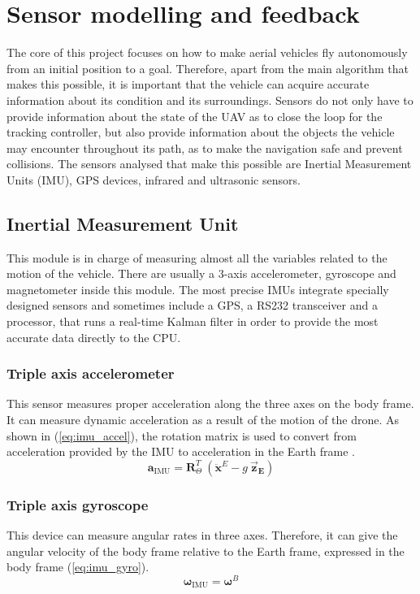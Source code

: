 \documentclass[journal, twoside]{IEEEtran}
\newcommand*{\subb}[1]{_{\mathrm{#1}}}
\begin{document}
	\section{Sensor modelling and feedback}
	The core of this project focuses on how to make aerial vehicles fly autonomously from an initial position to a goal. Therefore, apart from the main algorithm that makes this possible, it is important that the vehicle can acquire accurate information about its condition and its surroundings. Sensors do not only have to provide information about the state of the UAV as to close the loop for the tracking controller, but also provide information about the objects the vehicle may encounter throughout its path, as to make the navigation safe and prevent collisions. The sensors analysed that make this possible are Inertial Measurement Units (IMU), GPS devices, infrared and ultrasonic sensors.\\
	
	\subsection{Inertial Measurement Unit}
	This module is in charge of measuring almost all the variables related to the motion of the vehicle. There are usually a 3-axis accelerometer, gyroscope and magnetometer inside this module. The most precise IMUs integrate specially designed sensors and sometimes include a GPS, a RS232 transceiver and a processor, that runs a real-time Kalman filter in order to provide the most accurate data directly to the CPU. \\
	
	
	\subsubsection{Triple axis accelerometer} This sensor measures proper acceleration along the three axes on the body frame. It can measure dynamic acceleration as a result of the motion of the drone.  As shown in (\ref{eq:imu_accel}), the rotation matrix is used to convert from acceleration provided by the IMU to acceleration in the Earth frame \cite{modelling_control_mahony}.\\
	\begin{equation} \label{eq:imu_accel}
	\bm{a}\subb{IMU}= \bm{R}^T_\Theta \ (\bm{\ddot{x}}^E - g \ \bm{\vec{z}_E})
	\end{equation}
	
	\subsubsection{Triple axis gyroscope} This device can measure angular rates in three axes. Therefore, it can give the angular velocity of the body frame relative to the Earth frame, expressed in the body frame (\ref{eq:imu_gyro}).\\
	\begin{equation} \label{eq:imu_gyro}
	\bm{\omega}\subb{IMU}= \bm{\omega}^B 
	\end{equation}
	
\end{document}
